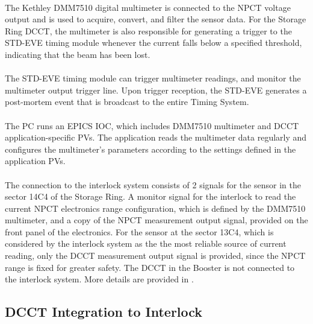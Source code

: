 \documentclass[openany]{article}
\begin{document}
	\paragraph{} The Kethley DMM7510 digital multimeter is connected to the NPCT voltage output and is used to acquire, convert, and filter the sensor data. For the Storage Ring DCCT, the multimeter is also responsible for generating a trigger to the STD-EVE timing module whenever the current falls below a specified threshold, indicating that the beam has been lost.

	\paragraph{} The STD-EVE timing module can trigger multimeter readings, and monitor the multimeter output trigger line. Upon trigger reception, the STD-EVE generates a post-mortem event that is broadcast to the entire Timing System.

	\paragraph{} The PC runs an EPICS IOC, which includes DMM7510 multimeter and DCCT application-specific PVs. The application reads the multimeter data regularly and configures the multimeter's parameters according to the settings defined in the application PVs.

 	\paragraph{} The connection to the interlock system consists of 2 signals for the sensor in the sector 14C4 of the Storage Ring. A monitor signal for the interlock to read the current NPCT electronics range configuration, which is defined by the DMM7510 multimeter, and a copy of the NPCT measurement output signal, provided on the front panel of the electronics. For the sensor at the sector 13C4, which is considered by the interlock system as the the most reliable source of current reading, only the DCCT measurement output signal is provided, since the NPCT range is fixed for greater safety. The DCCT in the Booster is not connected to the interlock system. More details are provided in \emph{}.

\subsection{DCCT Integration to Interlock}\label{sec:integration-interlock}
\end{document}

